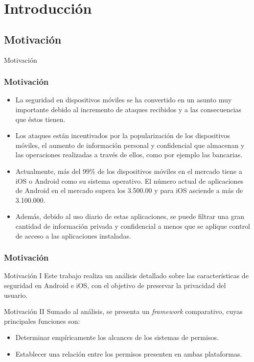 \section{Introducción}
\subsection{Motivación}
\begin{frame}
 \begin{center}
  \LARGE Motivación
 \end{center}
\end{frame}
\begin{frame}
 \frametitle{Motivación}
 \begin{itemize}
  \item La seguridad en dispositivos móviles se ha convertido en un asunto muy importante debido al incremento de ataques recibidos y a las consecuencias que éstos tienen.\pause
  \item Los ataques están incentivados por la popularización de los dispositivos móviles, \pause el aumento de información personal y confidencial que almacenan \pause y las operaciones realizadas a través de ellos, como por ejemplo las bancarias.\pause
  \item Actualmente, más del 99\% de los dispositivos móviles en el mercado tiene a iOS o Android como su sistema operativo. \pause El número actual de aplicaciones de Android en el mercado supera los 3.500.00 y para iOS asciende a más de 3.100.000.\pause
  \item Además, debido al uso diario de estas aplicaciones, se puede filtrar una gran cantidad de información privada y confidencial \pause a menos que se aplique control de acceso a las aplicaciones instaladas.
 \end{itemize}
\end{frame}
\begin{frame}
 \frametitle{Motivación}
 \begin{exampleblock}{Motivación I}
Este trabajo realiza un análisis detallado sobre las características de seguridad en Android e iOS, con el objetivo de preservar la privacidad del usuario.
  \end{exampleblock}
  \pause
  \begin{exampleblock}{Motivación II}
Sumado al análisis, se presenta un \emph{framework} comparativo, cuyas principales funciones son:
    \begin{itemize}
     \item Determinar empíricamente los alcances de los sistemas de permisos.
     \item Establecer una relación entre los permisos presenten en ambas plataformas.
    \end{itemize}
   \end{exampleblock}
\end{frame}



